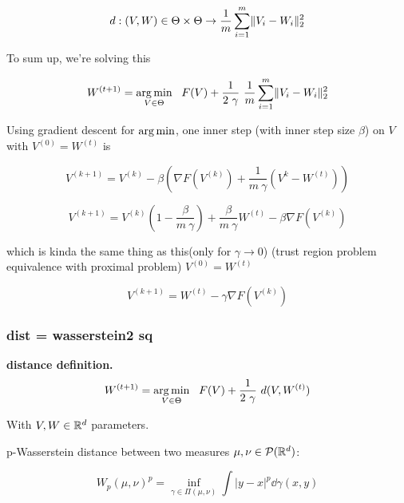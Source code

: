 \begin{equation}
	d : (V, W) \in \Theta \times \Theta \rightarrow \frac{1}{m} \sum_{i=1}^{m} \lVert V_i - W_i\rVert^2_2
\end{equation}

To sum up, we're solving this 

\begin{equation}
	W^{(t+1)} = \argmin_{V \in \Theta} \ \  F(V) + \frac{1}{2 ~ \gamma} ~ \frac{1}{m} \sum_{i=1}^{m} \norm{V_i - W_i}^2_2
\end{equation}

Using gradient descent for $\operatorname*{arg\,min}$, one inner step (with inner step size $\beta$) on $V$ with $V^{(0)} = W^{(t)}$ is

\begin{equation}
	V^{(k+1)} = V^{(k)} - \beta \left(\nabla F(V^{(k)}) + \frac{1}{m ~ \gamma} (V^{k} - W^{(t)}) \right) 
\end{equation}

\begin{equation}
	V^{(k+1)} = V^{(k)}\left(1 - \frac{\beta}{m ~ \gamma}\right) + \frac{\beta}{m ~ \gamma} W^{(t)}   - \beta \nabla F(V^{(k)})
\end{equation}

which is kinda the same thing as this(only for $\gamma \rightarrow 0$) (trust region problem equivalence with proximal problem) $V^{(0)} = W^{(t)}$

\begin{equation}
	V^{(k+1)} = W^{(t)} - \gamma \nabla F(V^{(k)})
\end{equation}

\subsubsection{dist = wasserstein2 sq}

\textbf{distance definition.}
\begin{equation}
	W^{(t+1)} = \operatorname*{arg\,min}_{V \in \Theta} \ \  F(V) + \frac{1}{2 ~ \gamma} ~ d(V, W^{(t)})
\end{equation}


With $V, W \in \mathbb{R}^d$ parameters.

p-Wasserstein distance between two measures $\mu, \nu \in \mathcal{P}(\mathbb{R}^d)$: 

\begin{equation}
	W_p(\mu, \nu)^p = \inf_{\gamma \in \Pi(\mu, \nu)} \int |y - x|^p \dd \gamma(x, y)
\end{equation}

